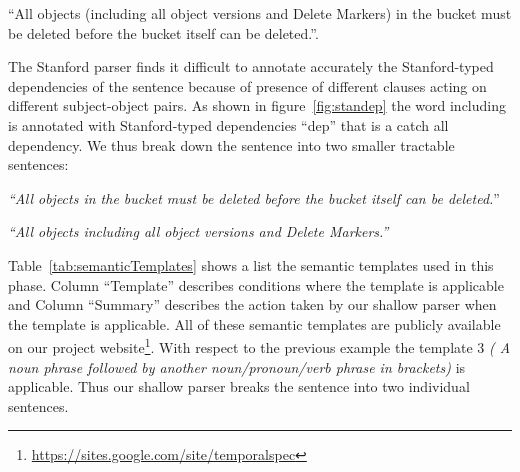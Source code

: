 \begin{center}
\scriptsize``All objects (including all object versions and Delete Markers) in the bucket must be deleted before the bucket itself can be deleted.''. \normalsize
\end{center}

The Stanford parser finds it difficult to annotate accurately the Stanford-typed dependencies of the sentence because of presence of different clauses acting on different subject-object pairs.
As shown in figure~\ref{fig:standep} the word including is annotated with Stanford-typed dependencies ``dep'' that is a catch all dependency. We thus break down the sentence into two smaller tractable sentences:

\begin{center}
\scriptsize \textit{``All objects in the bucket must be deleted before the bucket itself can be deleted.}''
	
\textit{``All objects including all object versions and Delete Markers.''}\normalsize 
\end{center} 


Table~\ref{tab:semanticTemplates} shows a list the semantic templates used in this phase.
Column ``Template'' describes conditions where the template is applicable and Column ``Summary'' describes the action taken by our shallow parser when the template is applicable.
All of these semantic templates are publicly available on our project website\footnote{\url{https://sites.google.com/site/temporalspec}}.
With respect to the previous example the template 3 \textit{( A noun phrase followed by another noun/pronoun/verb phrase in brackets)} is applicable.
Thus our shallow parser breaks the sentence into two individual sentences.
	 
